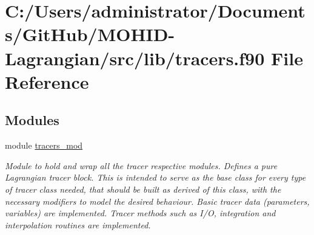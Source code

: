 \hypertarget{tracers_8f90}{}\section{C\+:/\+Users/administrator/\+Documents/\+Git\+Hub/\+M\+O\+H\+I\+D-\/\+Lagrangian/src/lib/tracers.f90 File Reference}
\label{tracers_8f90}
\subsection*{Modules}
\begin{DoxyCompactItemize}
\item 
module \mbox{\hyperlink{namespacetracers__mod}{tracers\+\_\+mod}}
\begin{DoxyCompactList}\small\item\em Module to hold and wrap all the tracer respective modules. Defines a pure Lagrangian tracer block. This is intended to serve as the base class for every type of tracer class needed, that should be built as derived of this class, with the necessary modifiers to model the desired behaviour. Basic tracer data (parameters, variables) are implemented. Tracer methods such as I/O, integration and interpolation routines are implemented. \end{DoxyCompactList}\end{DoxyCompactItemize}
